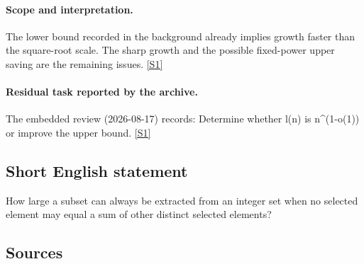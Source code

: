\documentclass[11pt,a4paper]{article}
\newcommand{\sref}[2]{\hyperlink{source:#1:#2}{[S#2]}}
\begin{document}
\paragraph{Scope and interpretation.}

The lower bound recorded in the background already implies growth faster than the square-root scale. The sharp growth and the possible fixed-power upper saving are the remaining issues. \sref{statement}{1}

\paragraph{Residual task reported by the archive.}

The embedded review (2026-08-17) records: Determine whether l(n) is n\textasciicircum{}(1-o(1)) or improve the upper bound. \sref{statement}{1}

\subsection{Short English statement}

How large a subset can always be extracted from an integer set when no selected element may equal a sum of other distinct selected elements?

\subsection{Sources}
\end{document}

